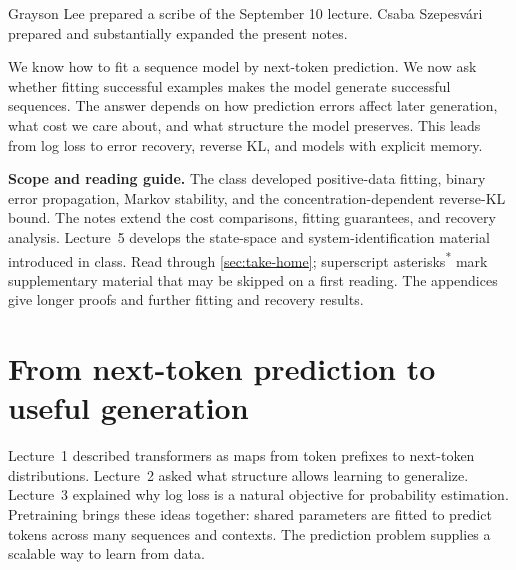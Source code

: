 \documentclass[11pt,twoside]{article}
\newcommand{\suppmark}{\texorpdfstring{\textsuperscript{*}}{*}}
\theoremstyle{definition}
\theoremstyle{remark}
\begin{document}
\begin{center}
\end{center}

\noindent Grayson Lee prepared a scribe of the September 10 lecture.
Csaba Szepesv\'ari prepared and substantially expanded the present notes.

\medskip
We know how to fit a sequence model by next-token prediction. We now ask
whether fitting successful examples makes the model generate successful
sequences. The answer depends on how prediction errors affect later
generation, what cost we care about, and what structure the model preserves.
This leads from log loss to error recovery, reverse KL, and models with
explicit memory.

\noindent\textbf{Scope and reading guide.}
The class developed positive-data fitting, binary error propagation, Markov
stability, and the concentration-dependent reverse-KL bound. The notes extend
the cost comparisons, fitting guarantees, and recovery analysis. Lecture~5
develops the state-space and system-identification material introduced in
class. Read through \cref{sec:take-home}; superscript asterisks\suppmark{}
mark supplementary material that may be skipped on a first reading.
The appendices give longer proofs and further fitting and recovery results.

\section{From next-token prediction to useful generation}
\label{sec:prediction-generation}

Lecture~1 described transformers as maps from token prefixes to
next-token distributions. Lecture~2 asked what structure allows learning
to generalize. Lecture~3 explained why log loss is a natural objective for
probability estimation. Pretraining brings these ideas together: shared
parameters are fitted to predict tokens across many sequences and contexts.
The prediction problem supplies a scalable way to learn from data.
\end{document}
